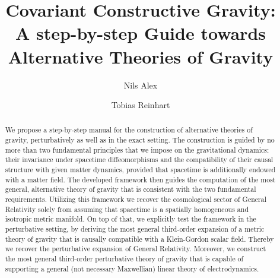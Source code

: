 \documentclass[%
preprint,
titlepage,
nofootinbib,
amsmath,amssymb,
showkeys,
aps,
prd,
floatfix,
]{revtex4-2}
\begin{document}

\title{Covariant Constructive Gravity:\\
A step-by-step Guide towards Alternative Theories of Gravity}

\author{Nils Alex}
\author{Tobias Reinhart}


\begin{abstract}
We propose a step-by-step manual for the construction of alternative theories of gravity, perturbatively as well as in the exact setting. The construction is guided by no more than two fundamental principles that we impose on the gravitational dynamics: their invariance under spacetime diffeomorphisms and the compatibility of their causal structure with given matter dynamics, provided that spacetime is additionally endowed with a matter field. The developed framework then guides the computation of the most general, alternative theory of gravity that is consistent with the two fundamental requirements.
Utilizing this framework we recover the cosmological sector of General Relativity solely from assuming that spacetime is a spatially homogeneous and isotropic metric manifold.
On top of that, we explicitly test the framework in the perturbative setting, by deriving the most general third-order expansion of a metric theory of gravity that is causally compatible with a Klein-Gordon scalar field. Thereby we recover the perturbative expansion of General Relativity. Moreover, we construct the most general third-order perturbative theory of gravity that is capable of supporting a general (not necessary Maxwellian) linear theory of electrodynamics.
\end{abstract}


\maketitle
\end{document}
